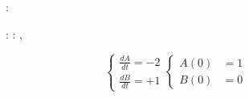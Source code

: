 \begin{figure}[t]

\begin{minipage}[t]{\linewidth}

{\centering 

\begin{Shaded}
\begin{Highlighting}[]
\end{Highlighting}
\end{Shaded}

}

\end{minipage}%
\newline
\begin{minipage}[t]{\linewidth}

{\centering 

\begin{minipage}[c]{0.60\linewidth}

{\centering 

\begin{Shaded}
\begin{Highlighting}[]
:

: \OperatorTok{=}\KeywordTok{(}\OperatorTok{=}\KeywordTok{)}
: \OperatorTok{=}\KeywordTok{(}\OperatorTok{=}\KeywordTok{)}
\OperatorTok{=}\KeywordTok{(}
\OperatorTok{=}\KeywordTok{[} \OperatorTok{*}\KeywordTok{]},
\OperatorTok{=}\NormalTok{\KeywordTok{[}B\KeywordTok{]},}
\OperatorTok{=}\NormalTok{,}
\KeywordTok{    )}
\end{Highlighting}
\end{Shaded}

}

\end{minipage}%
%
\begin{minipage}[c]{0.40\linewidth}

{\centering 

\[
\begin{cases}
    \frac{dA}{dt} = -2 \\
    \frac{dB}{dt} = +1
\end{cases}
\begin{cases}
    A(0) &= 1 \\
    B(0) &= 0
\end{cases}
\]

}
\end{minipage}}
\end{minipage}
\end{figure}
